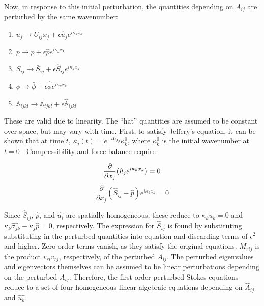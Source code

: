 \documentclass{article}
\begin{document}
Now, in response to this initial perturbation, the quantities depending on $A_{ij}$ are perturbed by the same wavenumber:

\begin{enumerate}
   \item $u_j \rightarrow \bar{U}_{ij}x_j +  \epsilon \hat{u}_j e^{i \kappa_k x_k}$
   \item $p \rightarrow \bar{p} + \epsilon \hat{p} e^{i \kappa_k x_k}$
   \item $S_{ij} \rightarrow \bar{S}_{ij} +  \epsilon \hat{S}_{ij} e^{i \kappa_k x_k}$
   \item $\phi \rightarrow \bar{\phi} + \epsilon \hat{\phi} e^{i \kappa_k x_k}$
   \item $\mathbb{A}_{ijkl} \rightarrow \bar{\mathbb{A}}_{ijkl} + \epsilon \hat{\mathbb{A}}_{ijkl}$
\end{enumerate}

These are valid due to linearity. The ``hat'' quantities are assumed to be constant over space, but may vary with time. First, to satisfy Jeffery's equation, it can be shown that at time $t$, $\kappa_j(t)=e^{-t U_{kj}} \kappa^0_k$, where $\kappa^0_k$ is the initial wavenumber at $t=0$ \citep{montgomery-smith2011}. Compressibility and force balance require

\begin{equation}
   \frac{\partial}{\partial x_j} (\hat{u}_j e^{i \kappa_k x_k}) = 0 \\ 
\end{equation}
\begin{equation}
   \frac{\partial}{\partial x_j}  (\hat{S}_{ij} - \hat{p}) e^{i \kappa_k x_k} = 0
\end{equation}

Since $\hat{S}_{ij}$, $\hat{p}$, and $\hat{u_i}$ are spatially homogeneous, these reduce to $\kappa_k u_k = 0$ and $\kappa_k \hat{\sigma_{jk}} -\kappa_j \hat{p} = 0$, respectively. The expression for $\hat{S}_{ij}$ is found by substituting substituting in the perturbed quantities into equation  and discarding terms of $\epsilon^2$ and higher. Zero-order terms vanish, as they satisfy the original equations. $M_{rij}$ is the product $v_{ri}v_{rj}$, respectively, of the perturbed $A_{ij}$. The perturbed eigenvalues and eigenvectors themselves can be assumed to be linear perturbations depending on the perturbed $A_{ij}$. Therefore, the first-order perturbed Stokes equations reduce to a set of four homogeneous linear algebraic equations depending on $\hat{A}_{ij}$ and $\hat{u_k}$.
\end{document}
